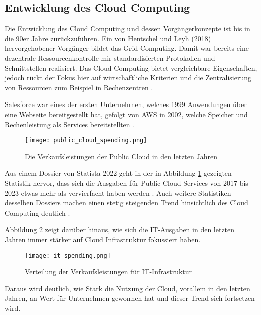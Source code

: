 \subsection{Entwicklung des Cloud Computing}
Die Entwicklung des Cloud Computing und dessen Vorgängerkonzepte ist bis in die 90er Jahre zurückzuführen. Ein von Hentschel und Leyh (2018) hervorgehobener Vorgänger bildet das Grid Computing. Damit war bereits eine dezentrale Ressourcenkontrolle mir standardisierten Protokollen und Schnittstellen realisiert. Das Cloud Computing bietet vergleichbare Eigenschaften, jedoch rückt der Fokus hier auf wirtschaftliche Kriterien und die Zentralisierung von Ressourcen zum Beispiel in Rechenzentren \cite[Vgl.][S. 5f]{Reinheimer2018}.

Salesforce war eines der ersten Unternehmen, welches 1999 Anwendungen über eine Webseite bereitgestellt hat, gefolgt von \ac{AWS} in 2002, welche Speicher und Rechenleistung als Services bereitstellten \cite[Vgl.][S. 17f]{Srivastava2018}.

\begin{figure}[H]
    \texttt{[image: public\_cloud\_spending.png]}
    \caption{Die Verkaufsleistungen der Public Cloud in den letzten Jahren \cite[S. 8]{Statista2022}}
    \label{fig:public_cloud_spending}
\end{figure}

Aus einem Dossier von Statista 2022 geht in der in Abbildung \ref{fig:public_cloud_spending} gezeigten Statistik hervor, dass sich die Ausgaben für Public Cloud Services von 2017 bis 2023 etwas mehr als vervierfacht haben werden \cite[Vgl.][S. 8]{Statista2022}. Auch weitere Statistiken desselben Dossiers machen einen stetig steigenden Trend hinsichtlich des Cloud Computing deutlich \cite[Vgl. unter anderem][S. 11ff]{Statista2022}. \pagebreak

Abbildung \ref{fig:it-spending} zeigt darüber hinaus, wie sich die IT-Ausgaben in den letzten Jahren immer stärker auf Cloud Infrastruktur fokussiert haben.

\begin{figure}[H]
    \texttt{[image: it\_spending.png]}
    \caption{Verteilung der Verkaufsleistungen für IT-Infrastruktur \cite[S. 7]{Statista2022}}
    \label{fig:it-spending}
\end{figure}

Daraus wird deutlich, wie Stark die Nutzung der Cloud, vorallem in den letzten Jahren, an Wert für Unternehmen gewonnen hat und dieser Trend sich fortsetzen wird. \pagebreak

